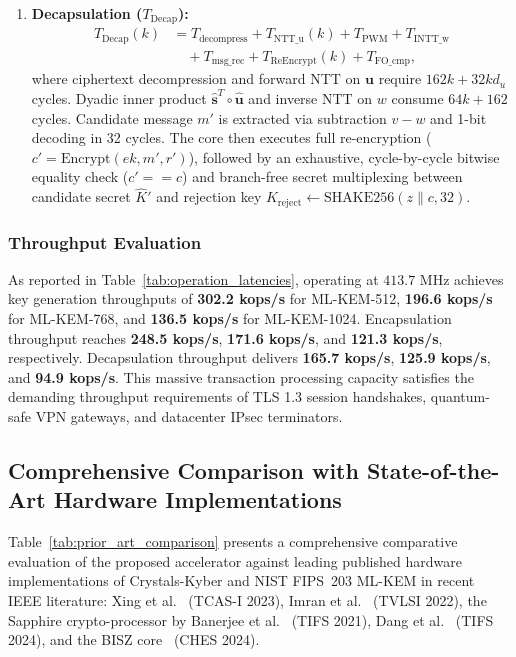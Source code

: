 \begin{enumerate}
    \item \textbf{Decapsulation ($T_{\text{Decap}}$):}
    \begin{align}
    \label{eq:latency_decap}
    T_{\text{Decap}}(k) &= T_{\text{decompress}} + T_{\text{NTT\_u}}(k) + T_{\text{PWM}} + T_{\text{INTT\_w}} \nonumber \\
    &\quad + T_{\text{msg\_rec}} + T_{\text{ReEncrypt}}(k) + T_{\text{FO\_cmp}},
    \end{align}
    where ciphertext decompression and forward NTT on $\mathbf{u}$ require $162k + 32kd_u$ cycles. Dyadic inner product $\hat{\mathbf{s}}^T \circ \hat{\mathbf{u}}$ and inverse NTT on $w$ consume $64k + 162$ cycles. Candidate message $m'$ is extracted via subtraction $v - w$ and 1-bit decoding in 32 cycles. The core then executes full re-encryption ($c' = \text{Encrypt}(ek, m', r')$), followed by an exhaustive, cycle-by-cycle bitwise equality check ($c' == c$) and branch-free secret multiplexing between candidate secret $\hat{K}'$ and rejection key $K_{\text{reject}} \leftarrow \text{SHAKE256}(z \parallel c, 32)$.
\end{enumerate}

\subsubsection{Throughput Evaluation}
As reported in Table~\ref{tab:operation_latencies}, operating at $413.7\text{ MHz}$ achieves key generation throughputs of \textbf{302.2 kops/s} for ML-KEM-512, \textbf{196.6 kops/s} for ML-KEM-768, and \textbf{136.5 kops/s} for ML-KEM-1024. Encapsulation throughput reaches \textbf{248.5 kops/s}, \textbf{171.6 kops/s}, and \textbf{121.3 kops/s}, respectively. Decapsulation throughput delivers \textbf{165.7 kops/s}, \textbf{125.9 kops/s}, and \textbf{94.9 kops/s}. This massive transaction processing capacity satisfies the demanding throughput requirements of TLS 1.3 session handshakes, quantum-safe VPN gateways, and datacenter IPsec terminators.

\subsection{Comprehensive Comparison with State-of-the-Art Hardware Implementations}
\label{sec:results_comparison}

Table~\ref{tab:prior_art_comparison} presents a comprehensive comparative evaluation of the proposed accelerator against leading published hardware implementations of Crystals-Kyber and NIST FIPS~203 ML-KEM in recent IEEE literature: Xing et al.~\cite{xing2023tcas1} (TCAS-I 2023), Imran et al.~\cite{imran2022tvlsi} (TVLSI 2022), the Sapphire crypto-processor by Banerjee et al.~\cite{banerjee2021sapphire} (TIFS 2021), Dang et al.~\cite{dang2024tifs} (TIFS 2024), and the BISZ core~\cite{bisz2024ches} (CHES 2024).

